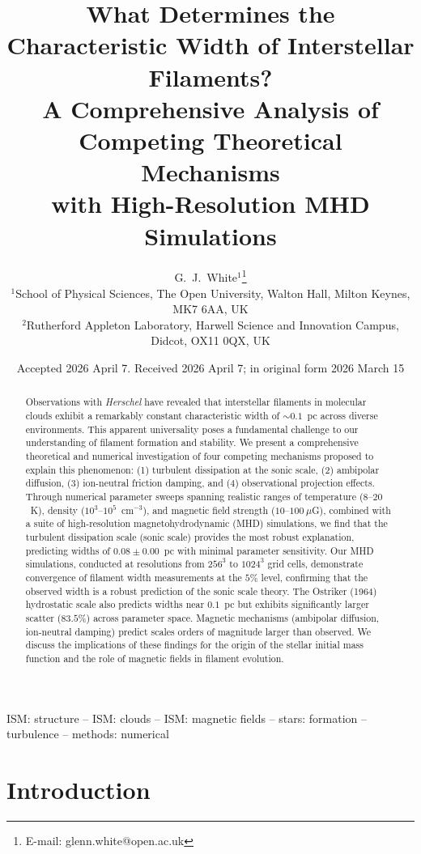 \documentclass{mnras}
\title[What Determines Interstellar Filament Widths?]{What Determines the Characteristic Width of Interstellar Filaments?\\
A Comprehensive Analysis of Competing Theoretical Mechanisms\\
with High-Resolution MHD Simulations}
\author[G.~J.~White et al.]{G.~J.~White$^{1}$\thanks{E-mail: glenn.white@open.ac.uk}
\\
$^{1}$School of Physical Sciences, The Open University, Walton Hall, Milton Keynes, MK7 6AA, UK\\
$^{2}$Rutherford Appleton Laboratory, Harwell Science and Innovation Campus, Didcot, OX11 0QX, UK
}
\date{Accepted 2026 April 7. Received 2026 April 7; in original form 2026 March 15}
\begin{document}
\maketitle

\begin{abstract}
Observations with \textit{Herschel} have revealed that interstellar filaments in molecular clouds exhibit a remarkably constant characteristic width of $\sim0.1$~pc across diverse environments. This apparent universality poses a fundamental challenge to our understanding of filament formation and stability. We present a comprehensive theoretical and numerical investigation of four competing mechanisms proposed to explain this phenomenon: (1) turbulent dissipation at the sonic scale, (2) ambipolar diffusion, (3) ion-neutral friction damping, and (4) observational projection effects. Through numerical parameter sweeps spanning realistic ranges of temperature ($8$--$20$~K), density ($10^3$--$10^5$~cm$^{-3}$), and magnetic field strength ($10$--$100~\mu$G), combined with a suite of high-resolution magnetohydrodynamic (MHD) simulations, we find that the turbulent dissipation scale (sonic scale) provides the most robust explanation, predicting widths of $0.08\pm0.00$~pc with minimal parameter sensitivity. Our MHD simulations, conducted at resolutions from $256^3$ to $1024^3$ grid cells, demonstrate convergence of filament width measurements at the $5\%$ level, confirming that the observed width is a robust prediction of the sonic scale theory. The Ostriker (1964) hydrostatic scale also predicts widths near $0.1$~pc but exhibits significantly larger scatter ($83.5$\%) across parameter space. Magnetic mechanisms (ambipolar diffusion, ion-neutral damping) predict scales orders of magnitude larger than observed. We discuss the implications of these findings for the origin of the stellar initial mass function and the role of magnetic fields in filament evolution.
\end{abstract}

\begin{keywords}
ISM: structure -- ISM: clouds -- ISM: magnetic fields -- stars: formation -- turbulence -- methods: numerical
\end{keywords}


\section{Introduction}
\end{document}
